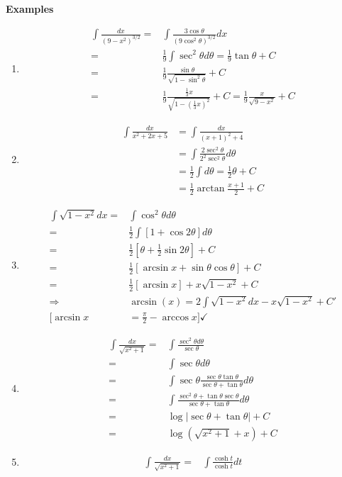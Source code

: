 \documentclass[12pt]{article}
\theoremstyle{plain}
\newcommand{\abs}[1]{\left| #1 \right|}
\begin{document}
	{\color{Brown}
	\textbf{Examples}
	\begin{enumerate}
		\item 
			\begin{align*}
				\int \frac{dx}{(9-x^2)^{3/2}}
				=&\int \frac{3\cos \theta}{(9\cos^2\theta)^{3/2}}dx\\
				=&\frac 19 \int \sec^2\theta d\theta 
				= \frac 19 \tan \theta + C \\
				=& \frac 19 \frac{\sin\theta}{\sqrt{1-\sin^2\theta}}+C\\
				=& \frac 19 \frac{\frac13 x}{\sqrt{1-(\frac13x)^2}}+C
				= \frac 19 \frac x{\sqrt{9-x^2}}+C
			\end{align*}
		\item 
			\begin{align*}
				\int \frac{dx}{x^2+2x+5} 
				&= \int \frac{dx}{(x+1)^2+4} 
				\tag{$x+1=2\tan\theta, dx=2\sec^2\theta d\theta$}\\
				&= \int \frac{2\sec^2\theta}{2^2\sec^2\theta}d\theta\\
				&= \frac12 \int d\theta = \frac12 \theta+C\\
				&= \frac12 \arctan \frac{x+1}2 + C
			\end{align*}

		\item 
			\begin{align*}
				\int \sqrt{1-x^2}dx
				=& \int \cos^2\theta d\theta\\
				=& \frac 12 \int [1+\cos 2\theta]d\theta\\
				=& \frac12[\theta + \frac12 \sin 2\theta] + C\\
				=& \frac12[\arcsin x + \sin \theta \cos \theta] + C\\
				=& \frac 12[\arcsin x]+ x\sqrt{1-x^2} + C\\
				\Rightarrow &\arcsin (x) = 2\int\sqrt{1-x^2}dx -x\sqrt{1-x^2}
				+ C'\\
				[\arcsin x &= \frac{\pi}2 -\arccos x] \checkmark
			\end{align*}

		\item 
			\begin{align*}
				\int \frac{dx}{\sqrt{x^2+1}}\tag{$x = \tan \theta, 
				dx = \sec^2 \theta d\theta$}
				=& \int \frac{\sec^2 \theta d\theta}{\sec \theta}\\
				=& \int \sec \theta d\theta\\
				=& \int \sec\theta \frac{\sec \theta \tan \theta}
				{\sec\theta + \tan \theta} d\theta\\
				=& \int \frac{\sec^2\theta +\tan \theta \sec \theta}
				{\sec \theta + \tan \theta} d\theta\\
				=& \log \abs{\sec\theta + \tan \theta} + C\\
				=& \log (\sqrt{x^2+1}+x)+C
			\end{align*}

		\item 
			\begin{align*}
				\int \frac{dx}{\sqrt{x^2+1}}\tag{$x = \tan \theta, $}
				=& \int \frac{\cosh t}{\cosh t} dt
			\end{align*}
	\end{enumerate}

	}
\end{document}
